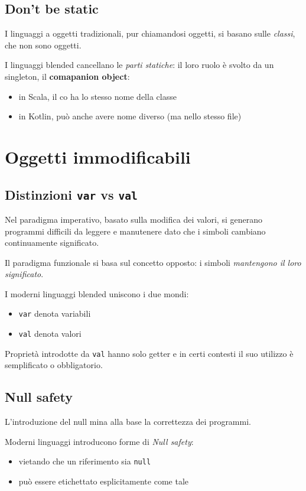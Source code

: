 \subsection{Don't be static}
I linguaggi a oggetti tradizionali, pur chiamandosi oggetti, si basano sulle \textit{classi}, che non sono oggetti.

I linguaggi blended cancellano le \textit{parti statiche}: il loro ruolo è svolto da un singleton, il \textbf{comapanion object}:
\begin{itemize}
    \item in Scala, il co ha lo stesso nome della classe
    \item in Kotlin, può anche avere nome diverso (ma nello stesso file)
\end{itemize}

\section{Oggetti immodificabili}

\subsection{Distinzioni \texttt{var} vs \texttt{val}}
Nel paradigma imperativo, basato sulla modifica dei valori, si generano programmi difficili da leggere e manutenere dato che i simboli cambiano continuamente significato.

Il paradigma funzionale si basa sul concetto opposto: i simboli \textit{mantengono il loro significato}.

I moderni linguaggi blended uniscono i due mondi:
\begin{itemize}
    \item \texttt{var} denota variabili
    \item \texttt{val} denota valori
\end{itemize}

Proprietà introdotte da \texttt{val} hanno solo getter e in certi contesti il suo utilizzo è semplificato o obbligatorio.

\subsection{Null safety}
L'introduzione del null mina alla base la correttezza dei programmi.

Moderni linguaggi introducono forme di \textit{Null safety}:
\begin{itemize}
    \item vietando che un riferimento sia \texttt{null}
    \item può essere etichettato esplicitamente come tale
\end{itemize}

